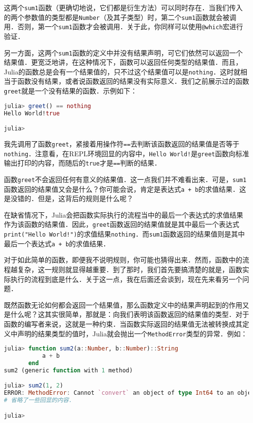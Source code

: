 这两个\verb|sum1|函数（更确切地说，它们都是衍生方法）可以同时存在．当我们传入的两个参数值的类型都是\verb|Number|（及其子类型）时，第二个\verb|sum1|函数就会被调用．否则，第一个\verb|sum1|函数才会被调用．关于此，你同样可以使用\verb|@which|宏进行验证．

另一方面，这两个\verb|sum1|函数的定义中并没有结果声明，可它们依然可以返回一个结果值．更宽泛地讲，在这种情况下，函数可以返回任何类型的结果值．而且，Julia的函数总是会有一个结果值的，只不过这个结果值可以是\verb|nothing|．这时就相当于函数没有结果，或者说函数返回的结果没有实际意义．我们之前展示过的函数\verb|greet|就是一个没有结果的函数．示例如下：

\begin{lstlisting}[language=julia]
julia> greet() == nothing
Hello World!true

julia> 
\end{lstlisting}

我先调用了函数\verb|greet|，紧接着用操作符\verb|==|去判断该函数返回的结果值是否等于\verb|nothing|．注意看，在REPL环境回显的内容中，\verb|Hello World!|是\verb|greet|函数向标准输出打印的内容，而随后的\verb|true|才是\verb|==|判断的结果．

函数\verb|greet|不会返回任何有意义的结果值．这一点我们并不难看出来．可是，\verb|sum1|函数返回的结果值又会是什么？你可能会说，肯定是表达式\verb|a + b|的求值结果．这是没错的．但是，这背后的规则是什么呢？

在缺省情况下，Julia会把函数实际执行的流程当中的最后一个表达式的求值结果作为该函数的结果值．因此，\verb|greet|函数返回的结果值就是其中最后一个表达式\verb|print("Hello World!")|的求值结果\verb|nothing|．而\verb|sum1|函数返回的结果值则是其中最后一个表达式\verb|a + b|的求值结果．

对于如此简单的函数，即便我不说明规则，你可能也猜得出来．然而，函数中的流程越复杂，这一规则就显得越重要．到了那时，我们首先要搞清楚的就是，函数实际执行的流程到底是什么．关于这一点，我在后面还会谈到，现在先来看另一个问题．

既然函数无论如何都会返回一个结果值，那么函数定义中的结果声明起到的作用又是什么呢？这其实很简单，那就是：向我们表明该函数返回的结果值的类型．对于函数的编写者来说，这就是一种约束．当函数实际返回的结果值无法被转换成其定义中声明的结果类型的值时，Julia就会抛出一个\verb|MethodError|类型的异常．例如：

\begin{lstlisting}[language=julia]
julia> function sum2(a::Number, b::Number)::String
           a + b
       end
sum2 (generic function with 1 method)

julia> sum2(1, 2)
ERROR: MethodError: Cannot `convert` an object of type Int64 to an object of type String
# 省略了一些回显的内容．

julia> 
\end{lstlisting}

